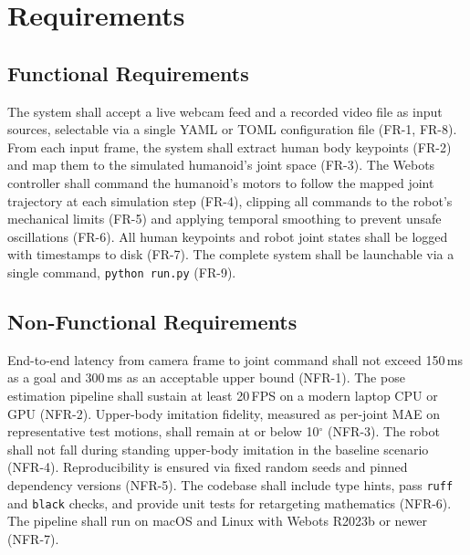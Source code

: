 \documentclass[conference]{IEEEtran}
\begin{document}
\section{Requirements}
 
\subsection{Functional Requirements}
The system shall accept a live webcam feed and a recorded video file as input sources,
selectable via a single YAML or TOML configuration file (FR-1, FR-8). From each input frame,
the system shall extract human body keypoints (FR-2) and map them to the simulated humanoid's
joint space (FR-3). The Webots controller shall command the humanoid's motors to follow the
mapped joint trajectory at each simulation step (FR-4), clipping all commands to the robot's
mechanical limits (FR-5) and applying temporal smoothing to prevent unsafe oscillations
(FR-6). All human keypoints and robot joint states shall be logged with timestamps to disk
(FR-7). The complete system shall be launchable via a single command, \texttt{python run.py}
(FR-9).
 
\subsection{Non-Functional Requirements}
End-to-end latency from camera frame to joint command shall not exceed 150\,ms as a goal and
300\,ms as an acceptable upper bound (NFR-1). The pose estimation pipeline shall sustain at
least 20\,FPS on a modern laptop CPU or GPU (NFR-2). Upper-body imitation fidelity, measured
as per-joint MAE on representative test motions, shall remain at or below 10$^{\circ}$
(NFR-3). The robot shall not fall during standing upper-body imitation in the baseline scenario
(NFR-4). Reproducibility is ensured via fixed random seeds and pinned dependency versions
(NFR-5). The codebase shall include type hints, pass \texttt{ruff} and \texttt{black} checks,
and provide unit tests for retargeting mathematics (NFR-6). The pipeline shall run on macOS
and Linux with Webots R2023b or newer (NFR-7).
 
\end{document}
